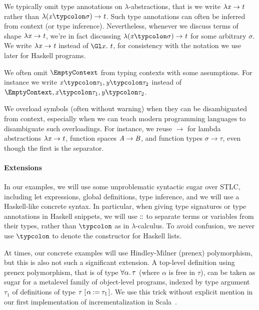 \begin{notation}
We typically omit type annotations on $\lambda$-abstractions,
that is we write \ensuremath{\lambda \Varid{x}\to \Varid{t}} rather than \ensuremath{\lambda (\Varid{x}\typcolon\sigma)\to \Varid{t}}. Such
type annotations can often be inferred from context (or type
inference). Nevertheless, whenever we discuss terms of shape \ensuremath{\lambda \Varid{x}\to \Varid{t}}, we're in fact discussing \ensuremath{\lambda (\Varid{x}\typcolon\sigma)\to \Varid{t}} for some
arbitrary \ensuremath{\sigma}. We write \ensuremath{\lambda \Varid{x}\to \Varid{t}} instead of %
$\Gl x .\ t$, %
for consistency with the notation we use later for Haskell
programs.

We often omit \ensuremath{\EmptyContext} from typing contexts with some assumptions.
For instance we write \ensuremath{\Varid{x}\typcolon\tau_{1},\Varid{y}\typcolon\tau_{2}} instead of \ensuremath{\EmptyContext,\Varid{x}\typcolon\tau_{1},\Varid{y}\typcolon\tau_{2}}.

We overload symbols (often without warning) when they can be
disambiguated from context, especially when we can teach modern
programming languages to disambiguate such overloadings. For
instance, we reuse \ensuremath{\to } for lambda abstractions \ensuremath{\lambda \Varid{x}\to \Varid{t}},
function spaces \ensuremath{\Conid{A}\to \Conid{B}}, and function types \ensuremath{\sigma\to \tau}, even
though the first is the separator.
\end{notation}

\paragraph{Extensions}
In our examples, we will use some unproblematic syntactic sugar
over STLC, including let expressions, global definitions, type
inference, and we will use a Haskell-like concrete syntax. In
particular, when giving type signatures or type annotations in
Haskell snippets, we will use \ensuremath{\mathrel{:\mkern-1mu:}} to separate terms or variables
from their types, rather than \ensuremath{\typcolon} as in
$\lambda$-calculus. To avoid confusion, we never use \ensuremath{\typcolon} to
denote the constructor for Haskell lists.

At times, our concrete examples will use Hindley-Milner (prenex)
polymorphism, but this is also not such a significant extension.
A top-level definition using prenex polymorphism, that is of type
\ensuremath{\forall \alpha\hsforall \hsdot{\circ }{\mathpunct{.}}\tau} (where \ensuremath{\alpha} is free in \ensuremath{\tau}), can be
taken as sugar for a metalevel family of object-level programs,
indexed by type argument \ensuremath{\tau_{1}} of definitions of type \ensuremath{\tau\;[\mskip1.5mu \alpha\mathbin{:=}\tau_{1}\mskip1.5mu]}. We use this trick without explicit mention in
our first implementation of incrementalization in
Scala~\citep{CaiEtAl2014ILC}.

